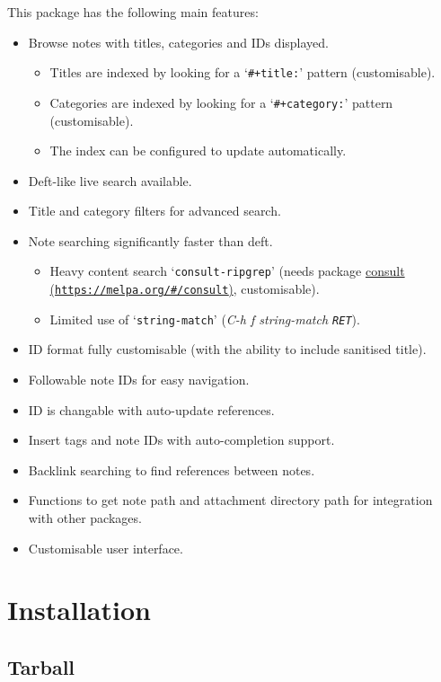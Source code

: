 \documentclass{book}
\newcommand\Texinfocommandstyletextkbd[1]{{\ttfamily\textsl{#1}}}%
\renewcommand{\_}{\Texinfounderscore\discretionary{}{}{}}
\begin{document}
This package has the following main features:
\begin{itemize}
\item Browse notes with titles, categories and IDs displayed.
\begin{itemize}
\item Titles are indexed by looking for a `\texttt{\#+title:}' pattern (customisable).
\item Categories are indexed by looking for a `\texttt{\#+category:}' pattern
(customisable).
\item The index can be configured to update automatically.
\end{itemize}
\item Deft-like live search available.
\item Title and category filters for advanced search.
\item Note searching significantly faster than deft.
\begin{itemize}
\item Heavy content search `\texttt{consult-ripgrep}' (needs package \href{https://melpa.org/\#/consult}{consult (\nolinkurl{https://melpa.org/\#/consult})},
customisable).
\item Limited use of `\texttt{string-match}' (\Texinfocommandstyletextkbd{C-h f string-match \texttt{RET}}).
\end{itemize}
\item ID format fully customisable (with the ability to include sanitised title).
\item Followable note IDs for easy navigation.
\item ID is changable with auto-update references.
\item Insert tags and note IDs with auto-completion support.
\item Backlink searching to find references between notes.
\item Functions to get note path and attachment directory path for integration with
other packages.
\item Customisable user interface.
\end{itemize}

\chapter{{Installation}}
\label{anchor:Installation}%


\section{{Tarball}}
\label{anchor:Tarball}%
\end{document}
